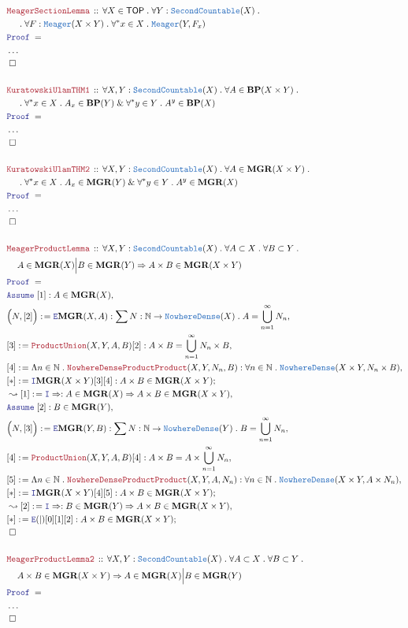 \documentclass[12pt]{scrartcl}
\newcommand{\TYPE}[1]{\textcolor{NavyBlue}{\mathtt{#1}}}
\newcommand{\LOGIC}[1]{\textcolor{Blue}{\mathtt{#1}}}
\newcommand{\THM}[1]{\textcolor{Maroon}{\mathtt{#1}}}
\renewcommand{\.}{\; . \;}
\newcommand{\de}{: \kern 0.1pc =}
\newcommand{\Theorem}[2]{& \THM{#1} \, :: \, #2 \\ & \Proof = \\ }
\newcommand{\NewLine}{\\ & \kern 1pc}
\newcommand{\Page}[1]{ \begin{align*} #1 \end{align*}   }
\newcommand{\NoProof}{ & \ldots \\ \EndProof}
\renewcommand{\And}{\; \& \;}
\newcommand{\Imply}{\Rightarrow}
\newcommand{\Intro}{\LOGIC{I}}
\newcommand{\Elim}{\LOGIC{E}}
\newcommand{\Nat}{\mathbb{N} }
\newcommand{\Say}[3]{& #1 \de #2 : #3, \\}
\newcommand{\Conclude}[3]{& #1 \de #2 : #3; \\}
\newcommand{\Derive}[3]{& \leadsto #1 \de #2 : #3, \\}
\newcommand{\Assume}[2]{& \LOGIC{Assume} \; #1 : #2, \\}
\newcommand{\QED}{\; \square}
\newcommand{\EndProof}{& \QED \\}
\newcommand{\Proof}{\LOGIC{Proof} \; }
\newcommand{\ND}{\TYPE{NowhereDense}}
\newcommand{\Meager}{\TYPE{Meager}}
\newcommand{\TOP}{\mathsf{TOP}}
\newcommand{\BP}{\mathbf{BP}}
\newcommand{\MGR}{\mathbf{MGR}}
\begin{document}
\Page{
	\Theorem{MeagerSectionLemma}
	{
		\forall X \in  \TOP \.
		\forall Y : \TYPE{SecondCountable}(X) \. \NewLine \. 
		\forall F : \Meager(X \times Y) \.
		\forall^* x \in X \. \Meager(Y,F_x)
	}
	\NoProof
	\\
	\Theorem{KuratowskiUlamTHM1}
	{
		\forall X,Y : \TYPE{SecondCountable}(X) \.
		\forall A \in \BP(X \times Y) 
		\. \NewLine \.
		\forall^* x \in X \.  A_x \in \BP(Y)
		\And
		\forall^* y \in Y \. A^y \in \BP(X)
	}
	\NoProof
	\\
	\Theorem{KuratowskiUlamTHM2 }
	{
		\forall X,Y : \TYPE{SecondCountable}(X) \.
		\forall A \in \MGR(X \times Y) \. 
		\NewLine \.
		\forall^* x \in X \.  A_x \in \MGR(Y)
		\And
		\forall^* y \in Y \. A^y \in \MGR(X)
	}
	\NoProof
	\\
	\Theorem{MeagerProductLemma}
	{
		\forall X,Y : \TYPE{SecondCountable}(X) \.
		\forall A \subset X \.
		\forall B \subset Y \.
		\NewLine
		A \in \MGR(X) \Big| B \in \MGR(Y)
		\Imply
		A \times B \in \MGR(X \times Y)
	}
	\Assume{[1]}{A \in \MGR(X)}
	\Say{\Big(N,[2]\Big)}{\Elim \MGR(X,A)}
	{
		\sum N : \Nat \to \ND(X) \. 
		A = \bigcup^\infty_{n=1} N_n
	}
	\Say{[3]}{\THM{ProductUnion}(X,Y,A,B)[2]}
	{
		A \times B = \bigcup_{n=1}^\infty N_n \times B
	}
	\Say{[4]}{\Lambda n \in \Nat \.\THM{NowhereDenseProductProduct}(X,Y,N_n,B)}
	{
		\forall n \in \Nat \. \ND(X \times Y,N_n \times B)
	}
	\Conclude{[*]}{\Intro \MGR(X \times Y)[3][4]}
	{
		A \times B \in \MGR(X \times Y)
	}
	\Derive{[1]}{\Intro \Imply}{A \in \MGR(X) \Imply A \times B \in \MGR(X\times Y)}
	\Assume{[2]}{B \in \MGR(Y)}
	\Say{\Big(N,[3]\Big)}{\Elim \MGR(Y,B)}
	{
		\sum N : \Nat \to \ND(Y) \. 
		B = \bigcup^\infty_{n=1} N_n
	}
	\Say{[4]}{\THM{ProductUnion}(X,Y,A,B)[4]}
	{
		A \times B = A \times \bigcup_{n=1}^\infty N_n
	}
	\Say{[5]}{\Lambda n \in \Nat \. \THM{NowhereDenseProductProduct}(X,Y,A,N_n)}
	{
		\forall n \in \Nat \. \ND(X \times Y,A \times N_n)
	}
	\Conclude{[*]}{\Intro \MGR(X \times Y)[4][5]}
	{
		A \times B \in \MGR(X \times Y)
	}
	\Derive{[2]}{\Intro \Imply}{B \in \MGR(Y) \Imply A \times B \in \MGR(X\times Y)}
	\Conclude{[*]}{\Elim(|)[0][1][2]}
	{
		A \times B \in \MGR(X\times Y)
	}	
	\EndProof
	\\
	\Theorem{MeagerProductLemma2}
	{
		\forall X,Y : \TYPE{SecondCountable}(X) \.
		\forall A \subset X \.
		\forall B \subset Y \.
		\NewLine
		A \times B \in \MGR(X \times Y)
		\Imply
		A \in \MGR(X) \Big| B \in \MGR(Y)
	}
	\NoProof
}
\end{document}
